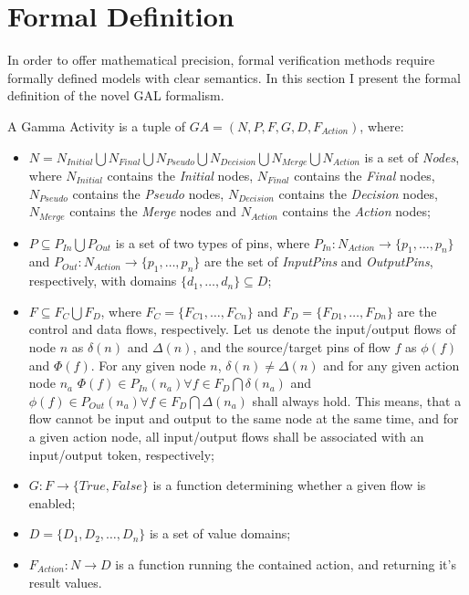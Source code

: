 \clearpage\section{Formal Definition}

In order to offer mathematical precision, formal verification methods require formally defined models with clear semantics. In this section I present the formal definition of the novel GAL formalism.

\begin{definition}
	A Gamma Activity is a tuple of \(GA = (N, P, F, G, D, F_{Action})\), where:
	
	\begin{itemize}
		\item \(N = N_\mathit{Initial} \bigcup N_\mathit{Final} \bigcup N_\mathit{Pseudo} \bigcup N_\mathit{Decision} \bigcup N_\mathit{Merge} \bigcup N_\mathit{Action} \) is a set of \emph{Nodes}, where \(N_\mathit{Initial}\) contains the \emph{Initial} nodes, \(N_\mathit{Final}\) contains the \emph{Final} nodes, \(N_\mathit{Pseudo}\) contains the \emph{Pseudo} nodes, \(N_\mathit{Decision}\) contains the \emph{Decision} nodes, \(N_\mathit{Merge}\) contains the \emph{Merge} nodes and \(N_\mathit{Action}\) contains the \emph{Action} nodes;
		\item \( P \subseteq P_\mathit{In} \bigcup P_\mathit{Out} \) is a set of two types of pins, where \(P_\mathit{In} : N_\mathit{Action} \rightarrow \{ p_1, \dots, p_n \} \) and \(P_\mathit{Out} : N_\mathit{Action} \rightarrow \{ p_1, \dots, p_n \} \) are the set of \emph{InputPins} and \emph{OutputPins}, respectively, with domains \(\{ d_1, \dots, d_n \} \subseteq D \);
		\item \( F \subseteq F_C \bigcup F_D \), where \(F_C = \{ F_{C1}, \dots, F_{Cn} \} \) and \(F_D = \{ F_{D1}, \dots, F_{Dn} \} \) are the control and data flows, respectively. Let us denote the input/output flows of node \(n\) as \( \delta(n) \) and \( \Delta(n) \), and the source/target pins of flow \(f\) as \(\phi(f)\) and \(\Phi(f)\). For any given node \(n\), \( \delta(n) \neq \Delta(n) \) and for any given action node \(n_a\) \( \Phi(f) \in P_\mathit{In}(n_a) \forall f \in F_D \bigcap \delta(n_a) \) and \( \phi(f) \in P_\mathit{Out}(n_a) \forall f \in F_D \bigcap \Delta(n_a) \) shall always hold. This means, that a flow cannot be input and output to the same node at the same time, and for a given action node, all input/output flows shall be associated with an input/output token, respectively;
		\item \(G : F \rightarrow \{ \mathit{True}, \mathit{False} \} \) is a function determining whether a given flow is enabled;
		\item \(D = \{ D_{1}, D_{2}, \dots, D_{n} \} \) is a set of value domains;
		\item \(F_{Action} : N \rightarrow D \) is a function running the contained action, and returning it's result values.
	\end{itemize}
	

\end{definition}
